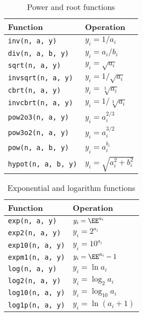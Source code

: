 \begin{table}
  \begin{tabularx}{\textwidth}{LL}
    \toprule
    Function & Operation \\
    \midrule
    \texttt{inv(n, a, y)}      & $y_i = 1 / a_i$              \\
    \texttt{div(n, a, b, y)}   & $y_i = a_i / b_i$            \\
    \texttt{sqrt(n, a, y)}     & $y_i = \sqrt{a_i}$           \\
    \texttt{invsqrt(n, a, y)}  & $y_i = 1 / \sqrt{a_i}$       \\
    \texttt{cbrt(n, a, y)}     & $y_i = \sqrt[3]{a_i}$        \\
    \texttt{invcbrt(n, a, y)}  & $y_i = 1 / \sqrt[3]{a_i}$    \\
    \texttt{pow2o3(n, a, y)}   & $y_i = a_i^{2/3}$            \\
    \texttt{pow3o2(n, a, y)}   & $y_i = a_i^{3/2}$            \\
    \texttt{pow(n, a, b, y)}   & $y_i = a_i^{b_i}$            \\
    \texttt{hypot(n, a, b, y)} & $y_i = \sqrt{a_i^2 + b_i^2}$ \\
    \bottomrule
  \end{tabularx}
  \caption{Power and root functions}
  \label{tab:Power and root functions}
\end{table}

\begin{table}
  \begin{tabularx}{\textwidth}{LL}
    \toprule
    Function & Operation \\
    \midrule
    \texttt{exp(n, a, y)}   & $y_i = \EE^{a_i}$     \\
    \texttt{exp2(n, a, y)}  & $y_i = 2^{a_i}$       \\
    \texttt{exp10(n, a, y)} & $y_i = 10^{a_i}$      \\
    \texttt{expm1(n, a, y)} & $y_i = \EE^{a_i} - 1$ \\
    \texttt{log(n, a, y)}   & $y_i = \ln a_i$       \\
    \texttt{log2(n, a, y)}  & $y_i = \log_2 a_i$    \\
    \texttt{log10(n, a, y)} & $y_i = \log_{10} a_i$ \\
    \texttt{log1p(n, a, y)} & $y_i = \ln(a_i + 1)$  \\
    \bottomrule
  \end{tabularx}
  \caption{Exponential and logarithm functions}
  \label{tab:Exponential and logarithm functions}
\end{table}

